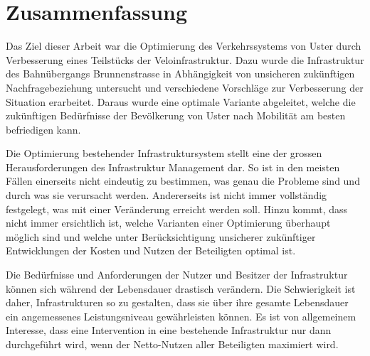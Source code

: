 %
%
%
%

\chapter*{Zusammenfassung}
\label{chap:Zusammen}

Das Ziel dieser Arbeit war die Optimierung des Verkehrssystems von Uster durch Verbesserung eines Teilstücks der Veloinfrastruktur. Dazu wurde die Infrastruktur des Bahnübergangs
Brunnenstrasse in Abhängigkeit von unsicheren zukünftigen Nachfragebeziehung untersucht und verschiedene Vorschläge zur Verbesserung der Situation erarbeitet. Daraus wurde eine optimale Variante abgeleitet, welche die zukünftigen Bedürfnisse der Bevölkerung von Uster nach Mobilität am besten befriedigen kann.

Die Optimierung bestehender Infrastruktursystem stellt eine der grossen Herausforderungen des Infrastruktur Management dar. So ist in den meisten Fällen einerseits nicht eindeutig zu bestimmen, was genau die Probleme sind und durch was sie verursacht werden. Andererseits ist nicht immer vollständig festgelegt, was mit einer Veränderung erreicht werden soll. Hinzu kommt, dass nicht immer ersichtlich ist, welche Varianten einer Optimierung überhaupt möglich sind und welche unter Berücksichtigung unsicherer zukünftiger Entwicklungen der Kosten und Nutzen der Beteiligten optimal ist.

Die Bedürfnisse und Anforderungen der Nutzer und Besitzer der Infrastruktur können sich während der Lebensdauer drastisch verändern. Die Schwierigkeit ist daher, Infrastrukturen so zu gestalten, dass sie über ihre gesamte Lebensdauer ein angemessenes Leistungsniveau gewährleisten können. Es ist von allgemeinem Interesse, dass eine Intervention in eine bestehende Infrastruktur nur dann durchgeführt wird, wenn der Netto-Nutzen aller Beteiligten maximiert wird.

